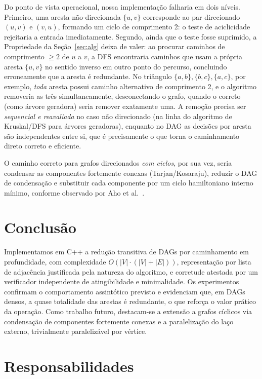 \documentclass[10pt,twocolumn]{article}
\begin{document}
Do ponto de vista operacional, nossa implementação falharia em dois níveis. Primeiro, uma aresta não-direcionada $\{u,v\}$ corresponde ao par direcionado $(u,v)$ e $(v,u)$, formando um ciclo de comprimento 2: o teste de aciclicidade rejeitaria a entrada imediatamente. Segundo, ainda que o teste fosse suprimido, a Propriedade da Seção~\ref{sec:alg} deixa de valer: ao procurar caminhos de comprimento $\geq 2$ de $u$ a $v$, a DFS encontraria caminhos que usam a própria aresta $\{u,v\}$ no sentido inverso em outro ponto do percurso, concluindo erroneamente que a aresta é redundante. No triângulo $\{a,b\},\{b,c\},\{a,c\}$, por exemplo, \emph{toda} aresta possui caminho alternativo de comprimento 2, e o algoritmo removeria as três simultaneamente, desconectando o grafo, quando o correto (como árvore geradora) seria remover exatamente uma. A remoção precisa ser \emph{sequencial e reavaliada} no caso não direcionado (na linha do algoritmo de Kruskal/DFS para árvores geradoras), enquanto no DAG as decisões por aresta são independentes entre si, que é precisamente o que torna o caminhamento direto correto e eficiente.

O caminho correto para grafos direcionados \emph{com ciclos}, por sua vez, seria condensar as componentes fortemente conexas (Tarjan/Kosaraju), reduzir o DAG de condensação e substituir cada componente por um ciclo hamiltoniano interno mínimo, conforme observado por Aho et al.~\cite{aho1972}.

\section{Conclusão}
\label{sec:conclusao}

Implementamos em C++ a redução transitiva de DAGs por caminhamento em profundidade, com complexidade $O(|V|\cdot(|V|+|E|))$, representação por lista de adjacência justificada pela natureza do algoritmo, e corretude atestada por um verificador independente de atingibilidade e minimalidade. Os experimentos confirmam o comportamento assintótico previsto e evidenciam que, em DAGs densos, a quase totalidade das arestas é redundante, o que reforça o valor prático da operação. Como trabalho futuro, destacam-se a extensão a grafos cíclicos via condensação de componentes fortemente conexas e a paralelização do laço externo, trivialmente paralelizável por vértice.

\section{Responsabilidades}
\label{sec:resp}
\end{document}
